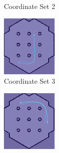 \documentclass[]{article}
\begin{document}
\begin{figure}[ht]
\begin{subfigure}[b]{0.45\textwidth}
			\caption{Coordinate Set 2}
			\label{fig:fig11}
		\end{subfigure}
		\vfill
		\begin{subfigure}[b]{0.45\textwidth}
			\centering
			\includegraphics[width=\textwidth]{Graphics/heatmapsim3.png}
			\caption{Coordinate Set 3}
			\label{fig:fig12}
		\end{subfigure}
		\hfill
		\begin{subfigure}[b]{0.45\textwidth}
			\centering
			\includegraphics[width=\textwidth]{Graphics/heatmapsim4.png}

\end{subfigure}
\end{figure}
\end{document}
